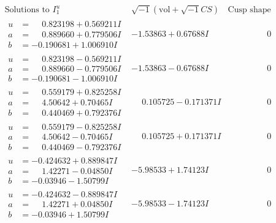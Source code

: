 \documentclass[1p]{elsarticle_modified}
\theoremstyle{definition}
\newcommand{\I}{\sqrt{-1}}
\begin{document}
$$\begin{array}{c|c|c}  
\text{Solutions to }I^u_{1}& \I (\text{vol} + \sqrt{-1}CS) & \text{Cusp shape}\\
 \hline 
\begin{aligned}
u &= \phantom{-}0.823198 + 0.569211 I \\
a &= \phantom{-}0.889660 + 0.779506 I \\
b &= -0.190681 + 1.006910 I\end{aligned}
 & -1.53863 + 0.67688 I & \phantom{-0.000000 } 0 \\ \hline\begin{aligned}
u &= \phantom{-}0.823198 - 0.569211 I \\
a &= \phantom{-}0.889660 - 0.779506 I \\
b &= -0.190681 - 1.006910 I\end{aligned}
 & -1.53863 - 0.67688 I & \phantom{-0.000000 } 0 \\ \hline\begin{aligned}
u &= \phantom{-}0.559179 + 0.825258 I \\
a &= \phantom{-}4.50642 + 0.70465 I \\
b &= \phantom{-}0.440469 + 0.792376 I\end{aligned}
 & \phantom{-}0.105725 - 0.171371 I & \phantom{-0.000000 } 0 \\ \hline\begin{aligned}
u &= \phantom{-}0.559179 - 0.825258 I \\
a &= \phantom{-}4.50642 - 0.70465 I \\
b &= \phantom{-}0.440469 - 0.792376 I\end{aligned}
 & \phantom{-}0.105725 + 0.171371 I & \phantom{-0.000000 } 0 \\ \hline\begin{aligned}
u &= -0.424632 + 0.889847 I \\
a &= \phantom{-}1.42271 - 0.04850 I \\
b &= -0.03946 - 1.50799 I\end{aligned}
 & -5.98533 + 1.74123 I & \phantom{-0.000000 } 0 \\ \hline\begin{aligned}
u &= -0.424632 - 0.889847 I \\
a &= \phantom{-}1.42271 + 0.04850 I \\
b &= -0.03946 + 1.50799 I\end{aligned}
 & -5.98533 - 1.74123 I & \phantom{-0.000000 } 0 \\ \hline\begin{aligned}

\end{aligned}
\end{array}$$
\end{document}

